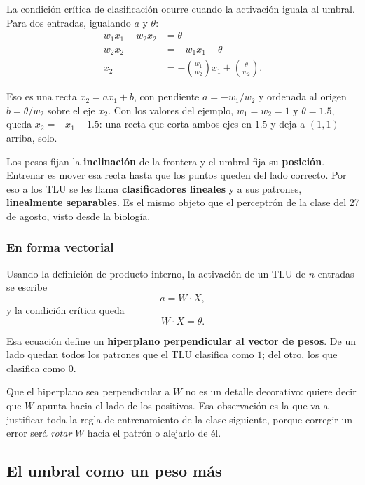 \documentclass[11pt,letterpaper]{article}
\begin{document}
La condición crítica de clasificación ocurre cuando la activación
iguala al umbral. Para dos entradas, igualando $a$ y $\theta$:
\begin{align*}
  w_1 x_1 + w_2 x_2 &= \theta \\
  w_2 x_2           &= -w_1 x_1 + \theta \\
  x_2               &= -\left(\frac{w_1}{w_2}\right) x_1
                       + \left(\frac{\theta}{w_2}\right) .
\end{align*}

Eso es una recta $x_2 = a x_1 + b$, con pendiente
$a = -w_1/w_2$ y ordenada al origen $b = \theta/w_2$ sobre el eje
$x_2$. Con los valores del ejemplo, $w_1 = w_2 = 1$ y
$\theta = 1.5$, queda $x_2 = -x_1 + 1.5$: una recta que corta ambos
ejes en $1.5$ y deja a $(1,1)$ arriba, solo.

\begin{idea}
  Los pesos fijan la \textbf{inclinación} de la frontera y el umbral
  fija su \textbf{posición}. Entrenar es mover esa recta hasta que
  los puntos queden del lado correcto. Por eso a los TLU se les llama
  \textbf{clasificadores lineales} y a sus patrones,
  \textbf{linealmente separables}. Es el mismo objeto que el
  perceptrón de la clase del 27 de agosto, visto desde la biología.
\end{idea}

\subsubsection*{En forma vectorial}

Usando la definición de producto interno, la activación de un TLU de
$n$ entradas se escribe
\[
    a = W \cdot X ,
\]
y la condición crítica queda
\[
    W \cdot X = \theta .
\]

Esa ecuación define un \textbf{hiperplano perpendicular al vector de
pesos}. De un lado quedan todos los patrones que el TLU clasifica
como $1$; del otro, los que clasifica como $0$.

\begin{ojo}
  Que el hiperplano sea perpendicular a $W$ no es un detalle
  decorativo: quiere decir que $W$ apunta hacia el lado de los
  positivos. Esa observación es la que va a justificar toda la regla
  de entrenamiento de la clase siguiente, porque corregir un error
  será \emph{rotar} $W$ hacia el patrón o alejarlo de él.
\end{ojo}

\subsection*{El umbral como un peso más}
\end{document}
